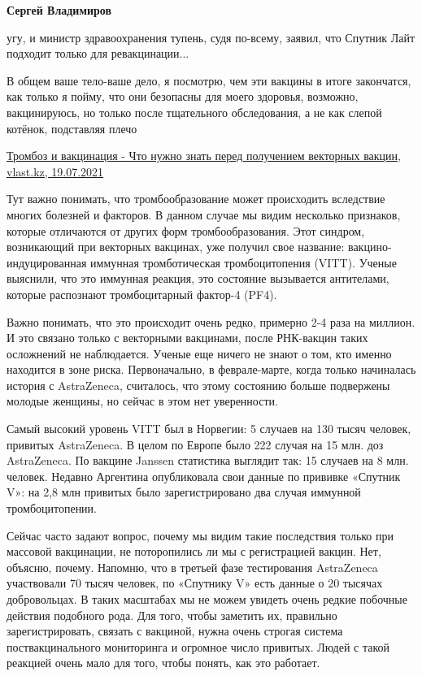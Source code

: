 \begin{itemize}
\begin{itemize}
\textbf{Сергей Владимиров} 

угу, и министр здравоохранения тупень, судя по-всему, заявил, что Спутник Лайт
подходит только для ревакцинации...

В общем ваше тело-ваше дело, я посмотрю, чем эти вакцины в итоге закончатся,
как только я пойму, что они безопасны для моего здоровья, возможно,
вакцинируюсь, но только после тщательного обследования, а не как слепой
котёнок, подставляя плечо

\end{itemize} %


\href{https://vlast.kz/avtory/45905-tromboz-i-vakcinacia.html}{%
Тромбоз и вакцинация - Что нужно знать перед получением векторных вакцин, vlast.kz, 19.07.2021%
}

\begin{itemize} %

Тут важно понимать, что тромбообразование может происходить вследствие многих
болезней и факторов. В данном случае мы видим несколько признаков, которые
отличаются от других форм тромбообразования. Этот синдром, возникающий при
векторных вакцинах, уже получил свое название: вакцино-индуцированная иммунная
тромботическая тромбоцитопения (VITT). Ученые выяснили, что это иммунная
реакция, это состояние вызывается антителами, которые распознают тромбоцитарный
фактор-4 (PF4).


Важно понимать, что это происходит очень редко, примерно 2-4 раза на миллион. И
это связано только с векторными вакцинами, после РНК-вакцин таких осложнений не
наблюдается. Ученые еще ничего не знают о том, кто именно находится в зоне
риска. Первоначально, в феврале-марте, когда только начиналась история с
AstraZeneca, считалось, что этому состоянию больше подвержены молодые женщины,
но сейчас в этом нет уверенности.

Самый высокий уровень VITT был в Норвегии: 5 случаев на 130 тысяч человек,
привитых AstraZeneca. В целом по Европе было 222 случая на 15 млн. доз
AstraZeneca. По вакцине Janssen статистика выглядит так: 15 случаев на 8 млн.
человек. Недавно Аргентина опубликовала свои данные по прививке «Спутник V»: на
2,8 млн привитых было зарегистрировано два случая иммунной тромбоцитопении.


Сейчас часто задают вопрос, почему мы видим такие последствия только при
массовой вакцинации, не поторопились ли мы с регистрацией вакцин. Нет, объясню,
почему. Напомню, что в третьей фазе тестирования AstraZeneca участвовали 70
тысяч человек, по «Спутнику V» есть данные о 20 тысячах добровольцах. В таких
масштабах мы не можем увидеть очень редкие побочные действия подобного рода.
Для того, чтобы заметить их, правильно зарегистрировать, связать с вакциной,
нужна очень строгая система поствакцинального мониторинга и огромное число
привитых. Людей с такой реакцией очень мало для того, чтобы понять, как это
работает.


\end{itemize}
\end{itemize}
